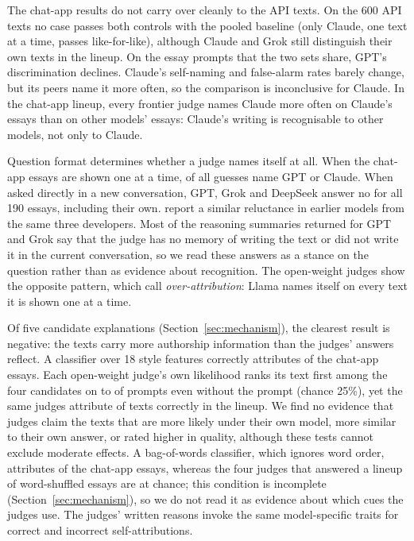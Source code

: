 The chat-app results do not carry over cleanly to the API texts. On the 600
API texts no case passes both controls with the pooled baseline (only Claude,
one text at a time, passes like-for-like), although Claude and Grok still
distinguish their own texts in the lineup. On the \CSprompts{} essay prompts
that the two sets share, GPT's discrimination declines. Claude's self-naming
and false-alarm rates barely change, but its peers name it more often, so the
comparison is inconclusive for Claude. In the chat-app lineup, every frontier
judge names Claude more often on Claude's essays than on other models'
essays: Claude's writing is recognisable to other models, not only to Claude.

Question format determines whether a judge names itself at all. When the
chat-app essays are shown one at a time, \SingleConcentration{} of all guesses
name GPT or Claude. When asked directly in a new conversation, GPT, Grok and
DeepSeek answer no for all 190 essays, including their own.
\citet{bai2025selfrecognition} report a similar reluctance in earlier models
from the same three developers. Most of the reasoning summaries returned for
GPT and Grok say that the judge has no memory of writing the text or did not
write it in the current conversation, so we read these answers as a stance on
the question rather than as evidence about recognition. The open-weight judges
show the opposite pattern, which \citet{bai2025selfrecognition} call
\emph{over-attribution}: Llama names itself on every text it is shown one at a
time.

Of five candidate explanations (Section~\ref{sec:mechanism}), the clearest
result is negative: the texts carry more authorship information than the
judges' answers reflect. A classifier over 18 style features correctly
attributes \EngineAAcc{} of the chat-app essays. Each open-weight judge's own
likelihood ranks its text first among the four candidates on
\OWLikUncRawMin{} to \OWLikUncRawMax{} of prompts even without the prompt
(chance 25\%), yet the same judges attribute \OWLineupAcc{} of texts correctly
in the lineup. We find no evidence that judges claim the texts that are more
likely under their own model, more similar to their own answer, or rated
higher in quality, although these tests cannot exclude moderate effects. A bag-of-words classifier, which ignores word order,
attributes \BowShufAcc{} of the chat-app essays, whereas the four judges that
answered a lineup of word-shuffled essays are at chance; this condition is
incomplete (Section~\ref{sec:mechanism}), so we do not read it as evidence
about which cues the judges use. The judges' written reasons invoke the same
model-specific traits for correct and incorrect self-attributions.

